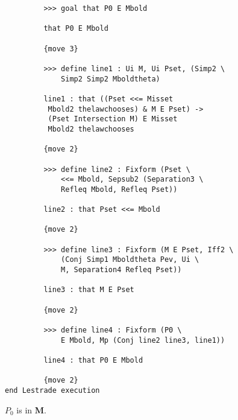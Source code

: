 \documentclass[12pt]{article}
\begin{document}
\begin{verbatim}
         >>> goal that P0 E Mbold

         that P0 E Mbold

         {move 3}

         >>> define line1 : Ui M, Ui Pset, (Simp2 \
             Simp2 Simp2 Mboldtheta)

         line1 : that ((Pset <<= Misset 
          Mbold2 thelawchooses) & M E Pset) -> 
          (Pset Intersection M) E Misset 
          Mbold2 thelawchooses

         {move 2}

         >>> define line2 : Fixform (Pset \
             <<= Mbold, Sepsub2 (Separation3 \
             Refleq Mbold, Refleq Pset))

         line2 : that Pset <<= Mbold

         {move 2}

         >>> define line3 : Fixform (M E Pset, Iff2 \
             (Conj Simp1 Mboldtheta Pev, Ui \
             M, Separation4 Refleq Pset))

         line3 : that M E Pset

         {move 2}

         >>> define line4 : Fixform (P0 \
             E Mbold, Mp (Conj line2 line3, line1))

         line4 : that P0 E Mbold

         {move 2}
end Lestrade execution
\end{verbatim}

$P_0$ is in {\bf M}.
\end{document}
